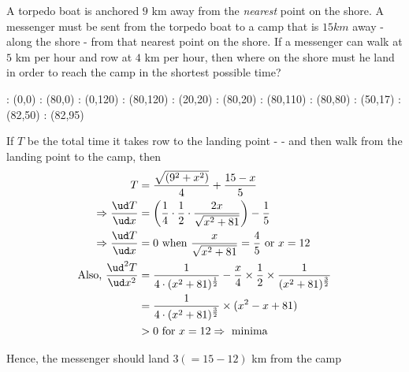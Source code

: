 
\question[3] A torpedo boat is anchored $9$ km away from the \textit{nearest} point
on the shore. A messenger must be sent from the torpedo boat to a camp that is 
$15km$ away - along the shore - from that nearest point on the shore. If a messenger
can walk at $5$ km per hour and row at $4$ km per hour, then where on the shore must
he land in order to reach the camp in the shortest possible time? 


\ifprintanswers
  \begin{marginfigure}
      : (0,0)
      : (80,0)
      : (0,120)
      : (80,120)
      : (20,20) %
      : (80,20) %
      : (80,110) %
      : (80,80) %
      : (50,17)
      : (82,50)
      : (82,95)
  	\figdrawbegin{}
      \figdrawline [100,102]
      \figdrawline [101,103]
      \figdrawline [104,105,106]
      \figdrawline [104,107]
      \figdrawline [104,106]
  	\figdrawend
  	\centerline{\box\figBoxA}
  \end{marginfigure}
\fi 

\begin{solution}[\fullpage]
   If $T$ be the total time it takes row to the landing point - \asif - 
   and then walk from the landing point to the camp, then
   \begin{align}
       T &= \dfrac{\sqrt{(9^2+x^2)}}{4} + \dfrac{15-x}{5} \\
       \Rightarrow \dfrac{\ud T}{\ud x} &= \left( \dfrac{1}{4}\cdot\dfrac{1}{2}\cdot\dfrac{2x}{\sqrt{x^2+81}}\right) - \dfrac{1}{5} \\
       \Rightarrow \dfrac{\ud T}{\ud x} &= 0\text{ when } \dfrac{x}{\sqrt{x^2+81}} = \dfrac{4}{5}
       \text{ or } x = 12 \\
       \text{Also, }\dfrac{\ud^2 T}{\ud x^2} &= \dfrac{1}{4\cdot(x^2+81)^{\frac{1}{2}}} 
                         - \dfrac{x}{4}\times\dfrac{1}{2}\times\dfrac{1}{(x^2+81)^{\frac{3}{2}}} \\
                         &= \dfrac{1}{4\cdot(x^2+81)^{\frac{3}{2}}}\times(x^2-x+81) \\
                         &> 0 \text{ for } x = 12 \Rightarrow \text{ minima }
   \end{align}
   
   Hence, the messenger should land $3(= 15 -12)$ km from the camp
\end{solution}
